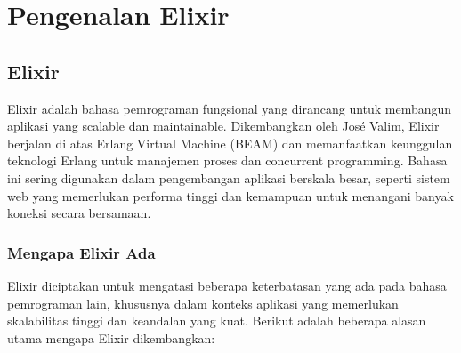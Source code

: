 
\chapter{Pengenalan Elixir}

\section{Elixir}

Elixir adalah bahasa pemrograman fungsional yang dirancang untuk membangun aplikasi yang scalable dan maintainable. Dikembangkan oleh José Valim, Elixir berjalan di atas Erlang Virtual Machine (BEAM) dan memanfaatkan keunggulan teknologi Erlang untuk manajemen proses dan concurrent programming. Bahasa ini sering digunakan dalam pengembangan aplikasi berskala besar, seperti sistem web yang memerlukan performa tinggi dan kemampuan untuk menangani banyak koneksi secara bersamaan.

\subsection{Mengapa Elixir Ada}

Elixir diciptakan untuk mengatasi beberapa keterbatasan yang ada pada bahasa pemrograman lain, khususnya dalam konteks aplikasi yang memerlukan skalabilitas tinggi dan keandalan yang kuat. Berikut adalah beberapa alasan utama mengapa Elixir dikembangkan:

